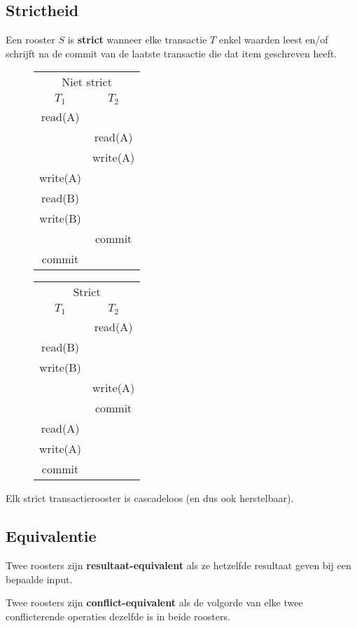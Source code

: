 \documentclass[transacties.tex]{subfiles}
\begin{document}
\subsection{Strictheid}
\begin{de}
Een rooster $S$ is \textbf{strict} wanneer elke transactie $T$ enkel waarden leest en/of schrijft na de commit van de laatste transactie die dat item geschreven heeft.
\end{de}
\begin{figure}[H]
\centering
\begin{tabular}{c|c}
\multicolumn{2}{c}{Niet strict}\\
$T_1$&$T_2$\\
\hline
read(A) &\\
& read(A)\\
&write(A)\\
write(A)&\\
read(B)&\\
write(B)&\\
&commit\\
commit&
\end{tabular}
\begin{tabular}{c|c}
\multicolumn{2}{c}{Strict}\\
$T_1$&$T_2$\\
\hline
& read(A)\\
read(B)&\\
write(B)&\\
& write(A)\\
&commit\\
read(A)&\\
write(A)&\\
commit&
\end{tabular}
\end{figure}
\begin{ei}
Elk strict transactierooster is cascadeloos (en dus ook herstelbaar).
\end{ei}

\subsection{Equivalentie}
\begin{de}
Twee roosters zijn \textbf{resultaat-equivalent} als ze hetzelfde resultaat geven bij een bepaalde input.
\end{de}
\begin{de}
Twee roosters zijn \textbf{conflict-equivalent} als de volgorde van elke twee conflicterende operaties dezelfde is in beide roosters.
\end{de}
\end{document}
